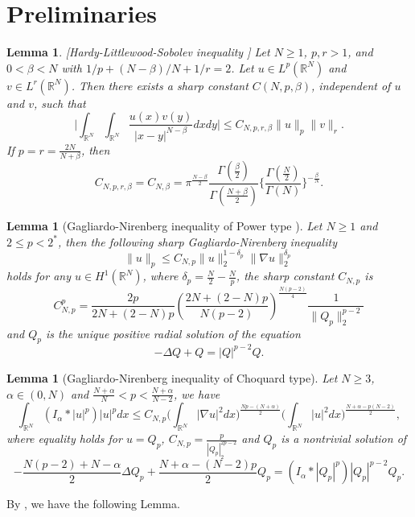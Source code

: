 \documentclass[10pt,a4paper]{amsart}
\numberwithin{equation}{section}
\newtheorem{lemma}[theo]{Lemma}
\begin{document}
\section{Preliminaries}

\begin{lemma}\label{L22}[Hardy-Littlewood-Sobolev inequality \cite{lieb}]
Let $N\geq1$, $p, r>1$, and $0<\beta<N$ with $1/p+(N-\beta)/N+1/r=2$. 
Let $u\in L^p(\mathbb{R}^N)$ and $v\in L^r(\mathbb{R}^N)$. 
Then there exists a sharp constant $C(N,p,\beta)$, independent of $u$ and $v$, 
such that
\[
\big|\int_{\mathbb{R}^N}\int_{\mathbb{R}^N}\frac{u(x)v(y)}{|x-y|^{N-\beta}}dxdy\big|
\leq C_{N,p,r,\beta}\| u\|_p \| v\| _r.
\]
If $p=r=\frac{2N}{N+\beta}$, then
\[
 C_{N,p,r,\beta}=C_{N,\beta}
 =\pi^{\frac{N-\beta}{2}}
 \frac{\Gamma(\frac{\beta}{2})}{\Gamma(\frac{N+\beta}{2})}
 \Big\{\frac{\Gamma(\frac{N}{2})}{\Gamma(N)}\Big\}^{-\frac{\beta}{N}}.
\]
\end{lemma}

\begin{lemma}[Gagliardo-Nirenberg inequality of Power type \cite{GN23}] \label{Gn75}
 Let $N\geq1$ and $2\leq p<2^*$, then the following sharp Gagliardo-Nirenberg 
inequality
 \begin{equation}\label{GN}
\| u\|_p\leq C_{N,p}\| u\|_2^{1-\delta_p}\| \nabla u\|_2^{\delta_p}
\end{equation}
holds for any $u\in H^1(\mathbb{R}^N)$, where $\delta_p=\frac{N}{2}-\frac{N}{p}$, 
the sharp constant $C_{N,p}$ is
\[
 C_{N,p}^p=\frac{2p}{2N+(2-N)p}(\frac{2N+(2-N)p}{N(p-2)})^{\frac{N(p-2)}{4}}
 \frac{1}{\|Q_p\|_2^{p-2}}
\]
and $Q_p$ is the unique positive radial solution of the equation
\[
 -\Delta Q+Q=|Q|^{p-2}Q.
\]
\end{lemma}

\begin{lemma}[Gagliardo-Nirenberg inequality of Choquard type\cite{Mza}] \label{123}
Let $N\geq3$, $\alpha\in(0,N)$ and $\frac{N+\alpha}{N}<p<\frac{N+\alpha}{N-2}$, we have
\begin{equation}\label{GN2}
 \int_{\mathbb{R}^N}(I_\alpha\ast|u|^p)|u|^pdx
 \leq C_{N,p}\Big(\int_{\mathbb{R}^N}|\nabla u|
 ^2dx\Big)^{\frac{Np-(N+\alpha)}{2}}
 \Big(\int_{\mathbb{R}^N}|u|^2dx\Big)^{\frac{N+\alpha-p(N-2)}{2}},
\end{equation}
where equality holds for $u=Q_p$, $C_{N,p}=\frac{p}{|Q_p|_2^{2p-2}}$ and $Q_p$ 
is a nontrivial solution of
\begin{equation}
 -\frac{N(p-2)+N-\alpha}{2}\Delta Q_p+\frac{N+\alpha-(N-2)p}{2}Q_p
 =(I_\alpha\ast|Q_p|^p)|Q_p|^{p-2}Q_p.
\end{equation}
\end{lemma}
By \cite[(3.3)]{banqun}, we have the following Lemma.
\end{document}
